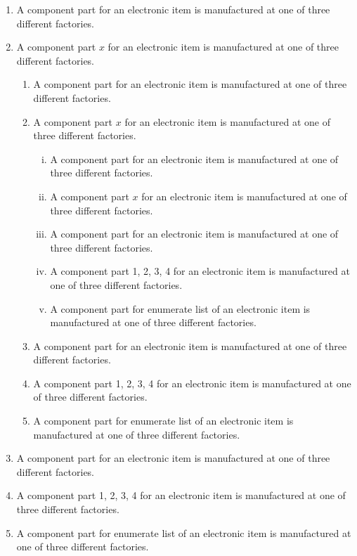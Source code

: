 \begin{enumerate}[1.]
\item A component part for an electronic item is
manufactured at one of three different factories.

\item A component part $x$ for an electronic item is
manufactured at one of three different factories.
\begin{enumerate}
\item A component part for an electronic item is
manufactured at one of three different factories.

\item A component part $x$ for an electronic item is
manufactured at one of three different factories.
\begin{enumerate}[iv.]
\item A component part for an electronic item is
manufactured at one of three different factories.

\item A component part $x$ for an electronic item is
manufactured at one of three different factories.

\item A component part for an electronic item is
manufactured at one of three different factories.

\item A component part 1, 2, 3, 4 for an electronic item is
manufactured at one of three different factories.

\item A component part for enumerate list of an electronic item is
manufactured at one of three different factories.

\end{enumerate}

\item A component part for an electronic item is
manufactured at one of three different factories.

\item A component part 1, 2, 3, 4 for an electronic item is
manufactured at one of three different factories.

\item A component part for enumerate list of an electronic item is
manufactured at one of three different factories.

\end{enumerate}

\item A component part for an electronic item is
manufactured at one of three different factories.

\item A component part 1, 2, 3, 4 for an electronic item is
manufactured at one of three different factories.

\item A component part for enumerate list of an electronic item is
manufactured at one of three different factories.

\end{enumerate}

